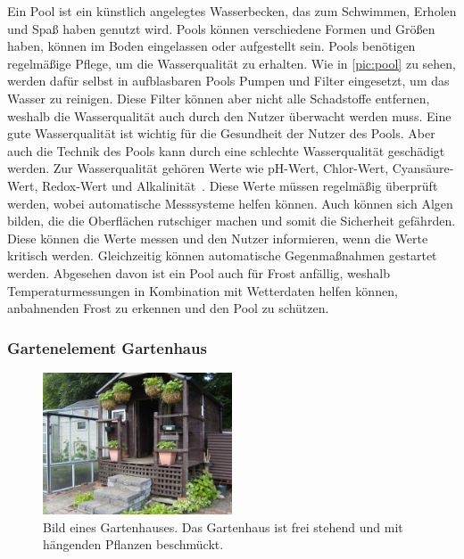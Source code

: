 
Ein Pool ist ein künstlich angelegtes Wasserbecken, das zum Schwimmen, Erholen und Spaß haben genutzt wird.
Pools können verschiedene Formen und Größen haben, können im Boden eingelassen oder aufgestellt sein.
Pools benötigen regelmäßige Pflege, um die Wasserqualität zu erhalten.
Wie in \cref{pic:pool} zu sehen, werden dafür selbst in aufblasbaren Pools Pumpen und Filter eingesetzt, um das Wasser zu reinigen.
Diese Filter können aber nicht alle Schadstoffe entfernen, weshalb die Wasserqualität auch durch den Nutzer überwacht werden muss.
Eine gute Wasserqualität ist wichtig für die Gesundheit der Nutzer des Pools.
Aber auch die Technik des Pools kann durch eine schlechte Wasserqualität geschädigt werden.
Zur Wasserqualität gehören Werte wie pH-Wert, Chlor-Wert, Cyansäure-Wert, Redox-Wert und Alkalinität~\cite{PoolWerte}.
Diese Werte müssen regelmäßig überprüft werden, wobei automatische Messsysteme helfen können.
Auch können sich Algen bilden, die die Oberflächen rutschiger machen und somit die Sicherheit gefährden.
Diese können die Werte messen und den Nutzer informieren, wenn die Werte kritisch werden.
Gleichzeitig können automatische Gegenmaßnahmen gestartet werden.
Abgesehen davon ist ein Pool auch für Frost anfällig, weshalb Temperaturmessungen in Kombination mit Wetterdaten helfen können, anbahnenden Frost zu erkennen und den Pool zu schützen.

\subsubsection{Gartenelement Gartenhaus}
\begin{figure}[!htb]
	\centering
	\includegraphics[width=0.5\textwidth]{images/Gartenhaus.jpg}
	\caption[Bild eines Gartenhauses.]{Bild eines Gartenhauses.
		Das Gartenhaus ist frei stehend und mit hängenden Pflanzen beschmückt.\footnotemark
	}
	\label{pic:gartenhaus}
\end{figure}

